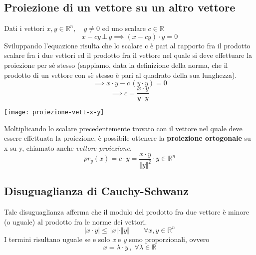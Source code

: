 			
			\subsection{Proiezione di un vettore su un altro vettore}
				Dati i vettori $ x, y \in \mathbb{R}^n, \quad y \neq 0 $ ed uno scalare $ c \in \mathbb{R} \ $
				$$ x - cy \, \bot \, y \implies (x - cy) \cdot y = 0 $$
				Sviluppando l'equazione risulta che lo scalare c è pari al rapporto fra il prodotto scalare fra i due vettori ed il prodotto fra il vettore nel quale si deve effettuare la proiezione per sè stesso (sappiamo, data la definizione della norma, che il prodotto di un vettore con sè stesso è pari al quadrato della sua lunghezza).
				$$ \implies x \cdot y - c \, ( y \cdot y)  = 0 $$
				$$ \implies c = \frac{x \cdot y}{y \cdot y}$$
				
				\begin{center}
					\texttt{[image: proiezione-vett-x-y]}
				\end{center}
				
				Moltiplicando lo scalare precedentemente trovato con il vettore nel quale deve essere effettuata la proiezione, è possibile ottenere la \textbf{proiezione ortogonale} su x su y, chiamato anche \textit{vettore proiezione}.
				$$ pr_y(x) = c \cdot y = \frac{x \cdot y}{\Vert y \Vert^2} \cdot y \in \mathbb{R}^n $$
			
			\subsection{Disuguaglianza di Cauchy-Schwanz}
				Tale disuguaglianza afferma che il modulo del prodotto fra due vettore è minore (o uguale) al prodotto fra le norme dei vettori.
				$$ \vert x \cdot y \vert \leq \Vert x \Vert \cdot \Vert y \Vert \qquad \forall x, y \in \mathbb{R}^n $$
				I termini risultano uguale se e solo \textit{x} e \textit{y} sono proporzionali, ovvero 
				$$ x = \lambda \cdot y \, , \; \forall \lambda \in \mathbb{R} $$
				
